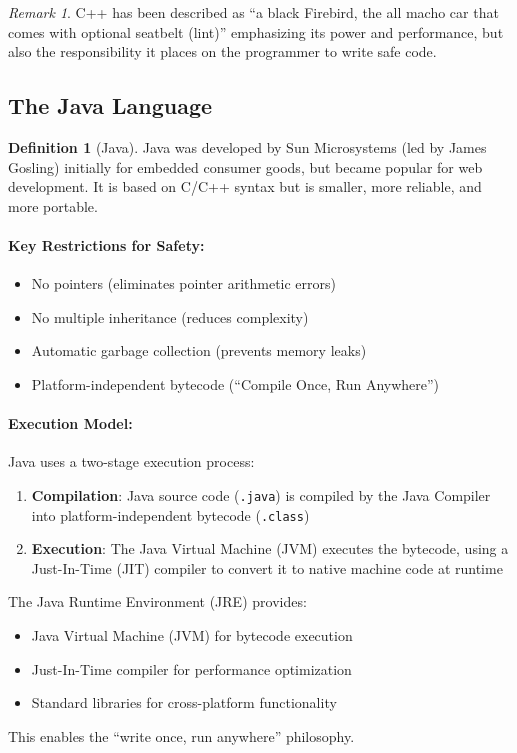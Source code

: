 \documentclass[11pt, a4paper, notitlepage]{report}
\theoremstyle{definition}
\newtheorem{definition}[theorem]{Definition}
\theoremstyle{remark}
\newtheorem{remark}[theorem]{Remark}
\theoremstyle{definition}
\begin{document}
\begin{remark}
C++ has been described as ``a black Firebird, the all macho car that comes with optional seatbelt (lint)''  emphasizing its power and performance, but also the responsibility it places on the programmer to write safe code.
\end{remark}

\subsection{The Java Language}

\begin{definition}[Java]
\label{def:ch1-java}
Java was developed by Sun Microsystems (led by James Gosling) initially for embedded consumer goods, but became popular for web development. It is based on C/C++ syntax but is smaller, more reliable, and more portable.
\end{definition}

\paragraph{Key Restrictions for Safety:}
\begin{itemize}
  \item No pointers (eliminates pointer arithmetic errors)
  \item No multiple inheritance (reduces complexity)
  \item Automatic garbage collection (prevents memory leaks)
  \item Platform-independent bytecode (``Compile Once, Run Anywhere'')
\end{itemize}

\paragraph{Execution Model:}

Java uses a two-stage execution process:
\begin{enumerate}
  \item \textbf{Compilation}: Java source code (\texttt{.java}) is compiled by the Java Compiler into platform-independent bytecode (\texttt{.class})
  \item \textbf{Execution}: The Java Virtual Machine (JVM) executes the bytecode, using a Just-In-Time (JIT) compiler to convert it to native machine code at runtime
\end{enumerate}

\begin{keyresult}[title={Java's Platform Independence}]
The Java Runtime Environment (JRE) provides:
\begin{itemize}
  \item Java Virtual Machine (JVM) for bytecode execution
  \item Just-In-Time compiler for performance optimization
  \item Standard libraries for cross-platform functionality
\end{itemize}
This enables the ``write once, run anywhere'' philosophy.
\end{keyresult}
\end{document}
